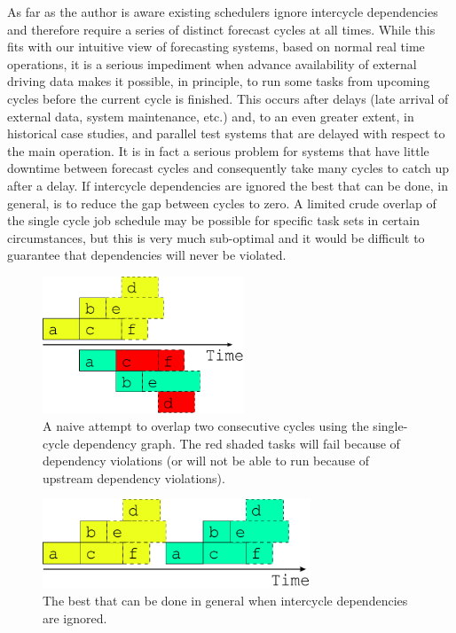 \documentclass[11pt,a4paper]{article}
\begin{document}
As far as the author is aware existing schedulers ignore intercycle
dependencies and therefore require a series of distinct forecast cycles
at all times. While this fits with our intuitive view of forecasting
systems, based on normal real time operations, it is a serious
impediment when advance availability of external driving data makes it
possible, in principle, to run some tasks from upcoming cycles before
the current cycle is finished. This occurs after delays (late arrival of
external data, system maintenance, etc.) and, to an even greater extent,
in historical case studies, and parallel test systems that are delayed
with respect to the main operation. It is in fact a serious problem for
systems that have little downtime between forecast cycles and
consequently take many cycles to catch up after a delay. If intercycle
dependencies are ignored the best that can be done, in general, is to
reduce the gap between cycles to zero. A limited crude overlap of the
single cycle job schedule may be possible for specific task sets in
certain circumstances, but this is very much sub-optimal and it would be
difficult to guarantee that dependencies will never be violated.

\begin{figure} \label{fig-overlap}
    \begin{center}
        \includegraphics[width=6cm]{inkscape-svg/timeline-one-c} 
    \end{center}
    \caption{\small A naive attempt to overlap two consecutive cycles
    using the single-cycle dependency graph. The red shaded tasks will
    fail because of dependency violations (or will not be able to run
    because of upstream dependency violations).} 
\end{figure} 

\begin{figure} \label{fig-foo}
    \begin{center}
        \includegraphics[width=8cm]{inkscape-svg/timeline-one-a} 
    \end{center}
    \caption{\small The best that can be done in general when intercycle dependencies 
    are ignored.} 
\end{figure} 
\end{document}
